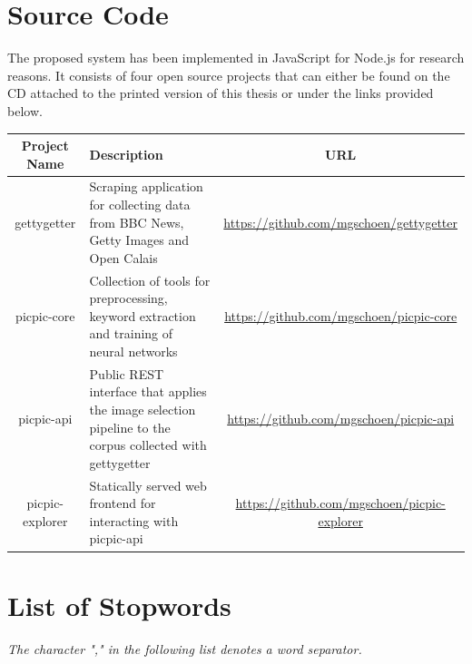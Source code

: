 \documentclass[11pt,a4paper,twoside]{article}
\begin{document}
\cleardoublepage
\begin{appendix}

\section{Source Code} \label{AppendixCode}

The proposed system has been implemented in JavaScript for Node.js for research reasons. It consists of four open source projects that can either be found on the CD attached to the printed version of this thesis or under the links provided below.

\begin{table}[h]
    \centering
    \begin{tabular}{|c|p{4.5cm}|c|}
        \hline
        \textbf{Project Name} & \textbf{Description} & \textbf{URL} \\
        \hline
        gettygetter & Scraping application for collecting data from BBC News, Getty Images and Open Calais & \url{https://github.com/mgschoen/gettygetter} \\
        \hline
        picpic-core & Collection of tools for preprocessing, keyword extraction and training of neural networks & \url{https://github.com/mgschoen/picpic-core} \\
        \hline
        picpic-api & Public REST interface that applies the image selection pipeline to the corpus collected with gettygetter & \url{https://github.com/mgschoen/picpic-api} \\
        \hline
        picpic-explorer & Statically served web frontend for interacting with picpic-api & \url{https://github.com/mgschoen/picpic-explorer} \\
        \hline
    \end{tabular}
    \label{table:source-code}
\end{table}

\clearpage

\section{List of Stopwords} \label{AppendixStopwords}

\emph{The character "," in the following list denotes a word separator.}

\bigskip


\end{appendix}
\end{document}
